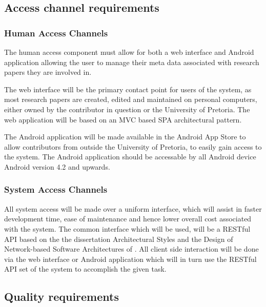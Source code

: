 \documentclass[a4paper,10pt]{article}
\begin{document}
\subsection{Access channel requirements}
\subsubsection{Human Access Channels}
The human access component must allow for both a web interface and Android application allowing the user to manage their meta data associated with research papers they are involved in. 

The web interface will be the primary contact point for users of the system, as most research papers are created, edited and maintained on personal computers, either owned by the contributor in question or the University of Pretoria. The web application will be based on an MVC based SPA architectural pattern. 

The Android application will be made available in the Android App Store to allow contributors from outside the University of Pretoria, to easily gain access to the system. The Android application should be accessable by all Android device Android version 4.2 and upwards.

\subsubsection{System Access Channels}
All system access will be made over a uniform interface, which will assist in faster development time, ease of maintenance and hence lower overall cost associated with the system. The common interface which will be used, will be a RESTful API based on the the dissertation Architectural Styles and
the Design of Network-based Software Architectures of \textcite{fielding}.  All client side interaction will be done via the web interface or Android application which will in turn use the RESTful API set of the system to accomplish the given task.

\subsection{Quality requirements}
\end{document}
